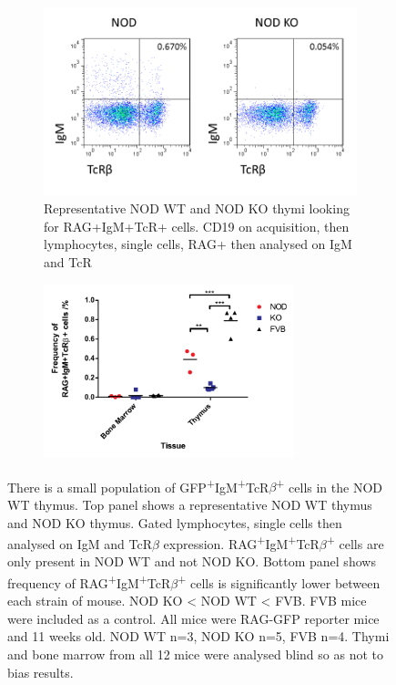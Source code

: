 \begin{figure}
	\begin{subfigure}{\textwidth}
	\includegraphics[width=\textwidth]{Figures/NODKOIgMTcR.png}
	\caption{Representative NOD WT and NOD KO thymi looking for RAG+IgM+TcR+ cells. CD19 on acquisition, then lymphocytes, single cells, RAG+ then analysed on IgM and TcR}
	\label{subfig:BMvThyRAGIgMTcR}
	\end{subfigure}
	\begin{subfigure}{\textwidth}
	\centering
	\includegraphics[width=0.8\textwidth]{Figures/IgMTcRposgraph.pdf}
	\caption{}
	\label{subfig:IgMTcRposgraph}
	\end{subfigure}
\caption[There is a very small population of IgM\textsuperscript{+}TcR$\beta$\textsuperscript{+} cells in the NOD thymus]{There is a small population of GFP\textsuperscript{+}IgM\textsuperscript{+}TcR$\beta$\textsuperscript{+} cells in the NOD WT thymus. 
Top panel shows a representative NOD WT thymus and NOD KO thymus.
Gated lymphocytes, single cells then analysed on IgM and TcR$\beta$ expression.
RAG\textsuperscript{+}IgM\textsuperscript{+}TcR$\beta$\textsuperscript{+} cells are only present in NOD WT and not NOD KO.
Bottom panel shows frequency of RAG\textsuperscript{+}IgM\textsuperscript{+}TcR$\beta$\textsuperscript{+} cells is significantly lower between each strain of mouse. NOD KO < NOD WT < FVB. FVB mice were included as a control.
All mice were RAG-GFP reporter mice and 11 weeks old. NOD WT n=3, NOD KO n=5, FVB n=4.
Thymi and bone marrow from all 12 mice were analysed blind so as not to bias results.}
\label{fig:RAGIgMTcRpos}
\end{figure}

